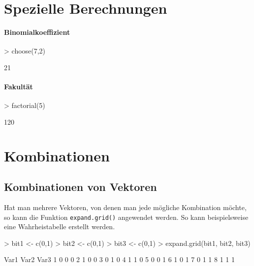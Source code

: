 \section{Spezielle Berechnungen}

\paragraph{Binomialkoeffizient}
\begin{Schunk}
\begin{Sinput}
> choose(7,2)
\end{Sinput}
\begin{Soutput}
[1] 21
\end{Soutput}
\end{Schunk}

\paragraph{Fakultät}
\begin{Schunk}
\begin{Sinput}
> factorial(5)
\end{Sinput}
\begin{Soutput}
[1] 120
\end{Soutput}
\end{Schunk}

\section{Kombinationen}

\subsection{Kombinationen von Vektoren}
Hat man mehrere Vektoren, von denen man jede mögliche
Kombination möchte, so kann die Funktion 
\lstinline{expand.grid()} angewendet werden.
So kann beispielsweise eine Wahrheistabelle erstellt werden.
\begin{Schunk}
\begin{Sinput}
> bit1 <- c(0,1)
> bit2 <- c(0,1)
> bit3 <- c(0,1)
> expand.grid(bit1, bit2, bit3)
\end{Sinput}
\begin{Soutput}
  Var1 Var2 Var3
1    0    0    0
2    1    0    0
3    0    1    0
4    1    1    0
5    0    0    1
6    1    0    1
7    0    1    1
8    1    1    1
\end{Soutput}
\end{Schunk}

